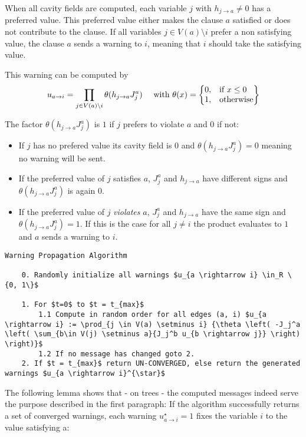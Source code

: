 When all cavity fields are computed, each variable $j$ with $h_{j \rightarrow a} \neq 0$ has a preferred value. This preferred value either makes the clause $a$ satisfied or does not contribute to the clause. If all variables $j \in V(a)\setminus i$ prefer a non satisfying value, the clause $a$ sends a warning to $i$, meaning that $i$ should take the satisfying value.

This warning can be computed by $$u_{a \rightarrow i} = \prod_{j\in V(a)\setminus i}{\theta(h_{j \rightarrow a}J_j^a)} \quad \text{ with } \theta(x) = \left\{
  \begin{array}{@{}ll@{}}
    0, & \text{if}\ x \leq 0 \\
    1, & \text{otherwise}
  \end{array}\right\}$$

The factor $\theta(h_{j \rightarrow a}J_j^a)$ is $1$ if $j$ prefers to violate $a$ and $0$ if not:
\begin{itemize}
\item[] If $j$ has no prefered value its cavity field is $0$ and $\theta(h_{j \rightarrow a}J_j^a) = 0$ meaning no warning will be sent.
\item[] If the preferred value of $j$ satisfies $a$, $J_j^a$ and $h_{j \rightarrow a}$ have different signs and  $\theta(h_{j \rightarrow a}J_j^a)$ is again $0$.
\item[] If the preferred value of $j$ \emph{violates} $a$, $J_j^a$ and $h_{j \rightarrow a}$ have the same sign and $\theta(h_{j \rightarrow a}J_j^a) = 1$. If this is the case for all $j \neq i$ the product evaluates to $1$ and $a$ sends a warning to $i$.
\end{itemize}

\begin{lstlisting}[mathescape=true]
	Warning Propagation Algorithm
	
	0. Randomly initialize all warnings $u_{a \rightarrow i} \in_R \{0, 1\}$
	
	1. For $t=0$ to $t = t_{max}$
		1.1 Compute in random order for all edges (a, i) $u_{a \rightarrow i} := \prod_{j \in V(a) \setminus i} {\theta \left( -J_j^a \left( \sum_{b\in V(j) \setminus a}{J_j^b u_{b \rightarrow j}} \right) \right)}$
		1.2 If no message has changed goto 2.
	2. If $t = t_{max}$ return UN-CONVERGED, else return the generated warnings $u_{a \rightarrow i}^{\star}$
\end{lstlisting}

The following lemma shows that - on trees - the computed messages indeed serve the purpose described in the first paragraph: If the algorithm successfully returns a set of converged warnings, each warning $u^{\star}_{a \rightarrow i} = 1$ fixes the variable $i$ to the value satisfying a:

